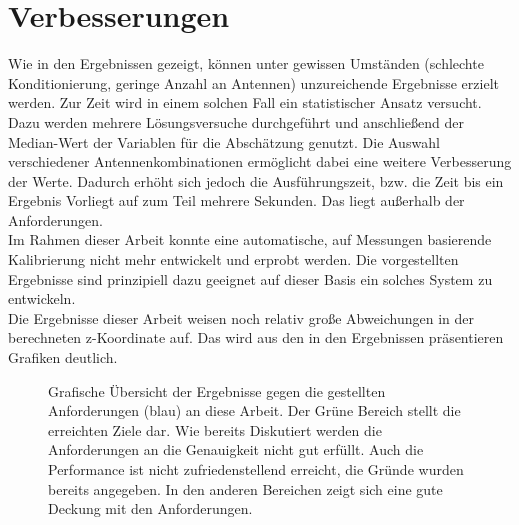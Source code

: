 %
\section{Verbesserungen}
%
Wie in den Ergebnissen gezeigt, können unter gewissen Umständen (schlechte Konditionierung, geringe Anzahl an Antennen) unzureichende Ergebnisse erzielt werden. Zur Zeit wird in einem solchen Fall ein statistischer Ansatz versucht. Dazu werden mehrere Lösungsversuche durchgeführt und anschließend der Median-Wert der Variablen für die Abschätzung genutzt. Die Auswahl verschiedener Antennenkombinationen ermöglicht dabei eine weitere Verbesserung der Werte. Dadurch erhöht sich jedoch die Ausführungszeit, bzw. die Zeit bis ein Ergebnis Vorliegt auf zum Teil mehrere Sekunden. Das liegt außerhalb der Anforderungen. \\
%
Im Rahmen dieser Arbeit konnte eine automatische, auf Messungen basierende Kalibrierung nicht mehr entwickelt und erprobt werden. Die vorgestellten Ergebnisse sind prinzipiell dazu geeignet auf dieser Basis ein solches System zu entwickeln.\\

Die Ergebnisse dieser Arbeit weisen noch relativ große Abweichungen in der berechneten z-Koordinate auf. Das wird aus den in den Ergebnissen präsentieren Grafiken deutlich.
%
\begin{figure}[ht!]
         \centering
         \caption[Anforderungsspinne]{ Grafische Übersicht der Ergebnisse gegen die gestellten Anforderungen (blau) an diese Arbeit. Der Grüne Bereich stellt die erreichten Ziele dar. Wie bereits Diskutiert werden die Anforderungen an die Genauigkeit nicht gut erfüllt. Auch die Performance ist nicht zufriedenstellend erreicht, die Gründe wurden bereits angegeben. In den anderen Bereichen zeigt sich eine gute Deckung mit den Anforderungen. }
         \vspace{2mm}
         \label{fig:Requirements_reached}
         
\end{figure}
%
